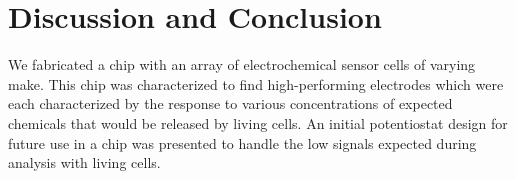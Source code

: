 \chapter{Discussion and Conclusion}

We fabricated a chip with an array of electrochemical sensor cells of varying make. This chip was characterized to find high-performing electrodes which were each characterized by the response to various concentrations of expected chemicals that would be released by living cells. An initial potentiostat design for future use in a chip was presented to handle the low signals expected during analysis with living cells.
